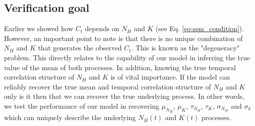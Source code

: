 \documentclass{aa}
\begin{document}
\subsection{Verification goal}
\label{sec:verify}
Earlier we showed how $C_t$ depends on $N_H$ and $K$ (see Eq. \ref{eq:ssm_condition}). However, an important point to note is that there is no unique combination of $N_H$ and $K$ that generates the observed $C_t$. This is known as the "degeneracy" problem. This directly relates to the capability of our model in inferring the true value of the mean of both processes. In addition, knowing the true temporal correlation structure of $N_H$ and $K$ is of vital importance. If the model can reliably recover the true mean and temporal correlation structure of $N_H$ and $K$ only is it then that we can recover the true underlying process. In other words, we test the performance of our model in recovering $\mu_{N_H}$, $\mu_K$, $\tau_{N_H}$, $\tau_K$, $\sigma_{N_H}$ and $\sigma_k$ which can uniquely describe the underlying $N_H(t)$ and $K(t)$ processes. \\
\end{document}
